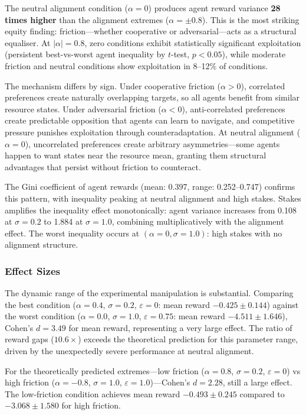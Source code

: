 The neutral alignment condition ($\alpha = 0$) produces agent reward variance \textbf{28 times higher} than the alignment extremes ($\alpha = \pm 0.8$). This is the most striking equity finding: friction---whether cooperative or adversarial---acts as a structural equaliser. At $|\alpha| = 0.8$, zero conditions exhibit statistically significant exploitation (persistent best-vs-worst agent inequality by $t$-test, $p < 0.05$), while moderate friction and neutral conditions show exploitation in 8--12\% of conditions.

The mechanism differs by sign. Under cooperative friction ($\alpha > 0$), correlated preferences create naturally overlapping targets, so all agents benefit from similar resource states. Under adversarial friction ($\alpha < 0$), anti-correlated preferences create predictable opposition that agents can learn to navigate, and competitive pressure punishes exploitation through counteradaptation. At neutral alignment ($\alpha = 0$), uncorrelated preferences create arbitrary asymmetries---some agents happen to want states near the resource mean, granting them structural advantages that persist without friction to counteract.

The Gini coefficient of agent rewards (mean: 0.397, range: 0.252--0.747) confirms this pattern, with inequality peaking at neutral alignment and high stakes. Stakes amplifies the inequality effect monotonically: agent variance increases from 0.108 at $\sigma = 0.2$ to 1.884 at $\sigma = 1.0$, combining multiplicatively with the alignment effect. The worst inequality occurs at $(\alpha = 0, \sigma = 1.0)$: high stakes with no alignment structure.

\subsubsection{Effect Sizes}

The dynamic range of the experimental manipulation is substantial. Comparing the best condition ($\alpha = 0.4$, $\sigma = 0.2$, $\varepsilon = 0$: mean reward $-0.425 \pm 0.144$) against the worst condition ($\alpha = 0.0$, $\sigma = 1.0$, $\varepsilon = 0.75$: mean reward $-4.511 \pm 1.646$), Cohen's $d = 3.49$ for mean reward, representing a very large effect. The ratio of reward gaps ($10.6\times$) exceeds the theoretical prediction for this parameter range, driven by the unexpectedly severe performance at neutral alignment.

For the theoretically predicted extremes---low friction ($\alpha = 0.8$, $\sigma = 0.2$, $\varepsilon = 0$) vs high friction ($\alpha = -0.8$, $\sigma = 1.0$, $\varepsilon = 1.0$)---Cohen's $d = 2.28$, still a large effect. The low-friction condition achieves mean reward $-0.493 \pm 0.245$ compared to $-3.068 \pm 1.580$ for high friction.

